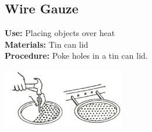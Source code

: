 \begin{multicols}{2}
%
%

\section{Wire Gauze}
\label{sec:wire-gauze}
\vspace{-10pt}
\textbf{Use:} Placing objects over heat\\
\textbf{Materials:} Tin can lid\\
\textbf{Procedure:} Poke holes in a tin can lid.
\begin{center}
\includegraphics[width=0.4\textwidth]{./img/source/wire-gauze.jpg}
\end{center}

\end{multicols}














